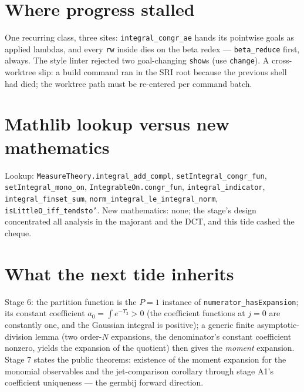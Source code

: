 \documentclass[11pt]{article}
\newcommand{\code}[1]{\texttt{#1}}
\begin{document}
\section{Where progress stalled}

One recurring class, three sites: \code{integral\_congr\_ae} hands
its pointwise goals as applied lambdas, and every \code{rw} inside
dies on the beta redex --- \code{beta\_reduce} first, always. The
style linter rejected two goal-changing \code{show}s (use
\code{change}). A cross-worktree slip: a build command ran in the
SRI root because the previous shell had died; the worktree path
must be re-entered per command batch.

\section{Mathlib lookup versus new mathematics}

\begin{sloppypar}
Lookup: \code{MeasureTheory.integral\_add\_compl},
\code{setIntegral\_congr\_fun}, \code{setIntegral\_mono\_on},
\code{IntegrableOn.congr\_fun}, \code{integral\_indicator},
\code{integral\_finset\_sum}, \code{norm\_integral\_le\_integral\_norm},
\code{isLittleO\_iff\_tendsto'}. New mathematics: none; the stage's
design concentrated all analysis in the majorant and the DCT, and
this tide cashed the cheque.
\end{sloppypar}

\section{What the next tide inherits}

Stage 6: the partition function is the $P = 1$ instance of
\code{numerator\_hasExpansion}; its constant coefficient
$a_0 = \int e^{-T_2} > 0$ (the coefficient functions at $j = 0$ are
constantly one, and the Gaussian integral is positive); a generic
finite asymptotic-division lemma (two order-$N$ expansions, the
denominator's constant coefficient nonzero, yields the expansion of
the quotient) then gives the \emph{moment} expansion. Stage 7 states
the public theorems: existence of the moment expansion for the
monomial observables and the jet-comparison corollary through stage
A1's coefficient uniqueness --- the germbij forward direction.
\end{document}
